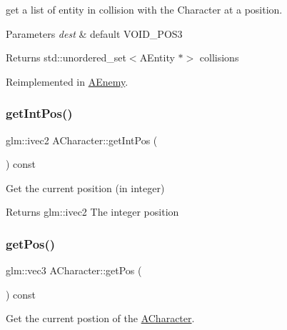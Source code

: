 get a list of entity in collision with the Character at a position. 


\begin{DoxyParams}{Parameters}
{\em dest} & default V\+O\+I\+D\+\_\+\+P\+O\+S3 \\
\hline
\end{DoxyParams}
\begin{DoxyReturn}{Returns}
std\+::unordered\+\_\+set$<$\+A\+Entity $\ast$$>$ collisions 
\end{DoxyReturn}


Reimplemented in \hyperlink{class_a_enemy_aca840427bf701f3c24b38a4c17a14cfd}{A\+Enemy}.

\mbox{\label{class_a_character_aa7562af195e3615c1f90488799687d9c}} 
\subsubsection{\texorpdfstring{get\+Int\+Pos()}{getIntPos()}}
{\footnotesize\ttfamily glm\+::ivec2 A\+Character\+::get\+Int\+Pos (\begin{DoxyParamCaption}{ }\end{DoxyParamCaption}) const}



Get the current position (in integer) 

\begin{DoxyReturn}{Returns}
glm\+::ivec2 The integer position 
\end{DoxyReturn}
\mbox{\label{class_a_character_a41875fc55beaafd65fbe53ea3abc7f98}} 
\subsubsection{\texorpdfstring{get\+Pos()}{getPos()}}
{\footnotesize\ttfamily glm\+::vec3 A\+Character\+::get\+Pos (\begin{DoxyParamCaption}{ }\end{DoxyParamCaption}) const\hspace{0.3cm}{\ttfamily [virtual]}}



Get the current postion of the \hyperlink{class_a_character}{A\+Character}. 

